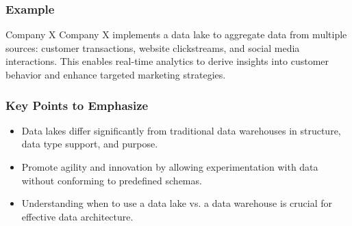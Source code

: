 \documentclass[aspectratio=169]{beamer}
\begin{document}
\begin{frame}[fragile]
    \frametitle{Example}
    \begin{block}{Company X}
        Company X implements a data lake to aggregate data from multiple sources: customer transactions, website clickstreams, and social media interactions. This enables real-time analytics to derive insights into customer behavior and enhance targeted marketing strategies.
    \end{block}
\end{frame}

\begin{frame}[fragile]
    \frametitle{Key Points to Emphasize}
    \begin{itemize}
        \item Data lakes differ significantly from traditional data warehouses in structure, data type support, and purpose.
        \item Promote agility and innovation by allowing experimentation with data without conforming to predefined schemas.
        \item Understanding when to use a data lake vs. a data warehouse is crucial for effective data architecture.
    \end{itemize}
\end{frame}
\end{document}
